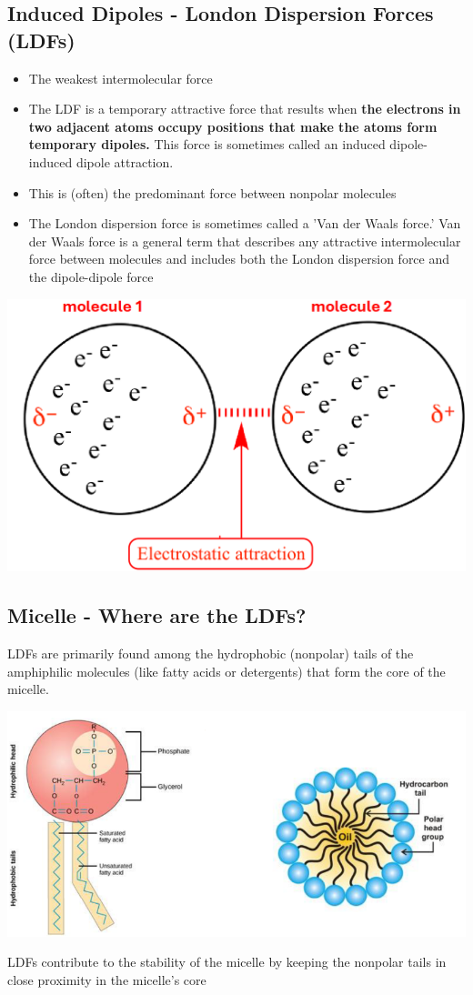 \documentclass[10pt]{article}
\begin{document}
\subsection*{Induced Dipoles - London Dispersion Forces (LDFs)}
\begin{itemize}
    \item The weakest intermolecular force
    \item The LDF is a temporary attractive force that results when \textbf{the electrons in two adjacent atoms occupy positions that make the atoms form temporary dipoles.}  This force is sometimes called an induced dipole-induced dipole attraction.
    \item This is (often) the predominant force between nonpolar molecules
    \item The London dispersion force is sometimes called a 'Van der Waals force.'  Van der Waals force is a general term that describes any attractive intermolecular force between molecules and includes both the London dispersion force and the dipole-dipole force
\end{itemize}
\begin{center}
    \includegraphics*[width=\textwidth]{L3_2.png}
\end{center}
\subsection*{Micelle - Where are the LDFs?}
LDFs are primarily found among the hydrophobic (nonpolar) tails of the amphiphilic molecules (like fatty acids or detergents) that form the core of the micelle.
\begin{center}
    \includegraphics*[width=\textwidth]{L3_3.png}
\end{center}
LDFs contribute to the stability of the micelle by keeping the nonpolar tails in close proximity in the micelle's core
\end{document}
